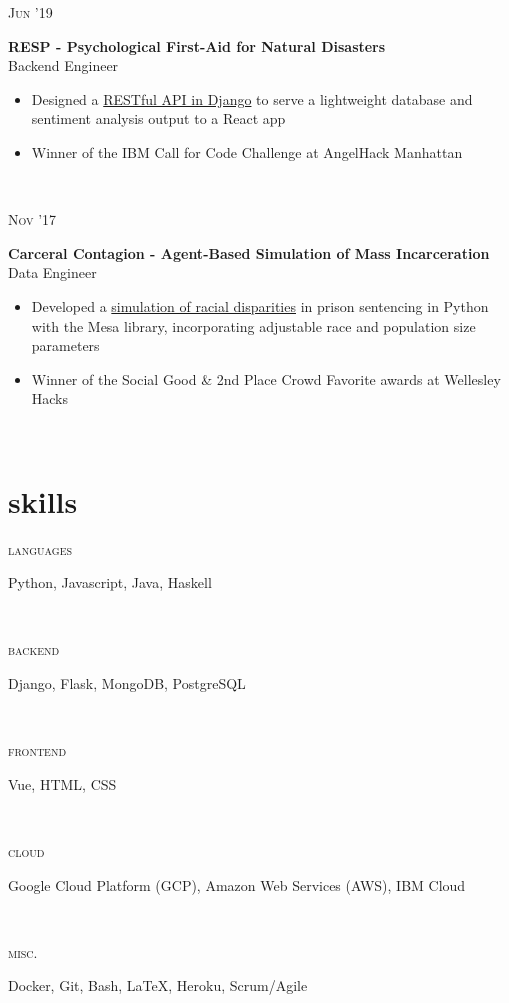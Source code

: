\documentclass[letterpaper, 11pt]{article}
\newcommand{\projectentry}[4]{
    \begin{minipage}[t]{.15\linewidth}
    \hfill \textsc{#1}
    \end{minipage}
    \hfill\vline\hfill
    \begin{minipage}[t]{.80\linewidth}
    {\bf#2}
    \\ #3 
    \vspace{-1.5mm}
    \small{#4}
    \end{minipage}\\
    \vspace{.2cm}
    }
\newcommand{\skillentry}[2]{
    \begin{minipage}[t]{.15\linewidth}
        \hfill \textsc{#1}
        \end{minipage}
        \hfill\vline\hfill
        \begin{minipage}[t]{.80\linewidth}
        #2
        \end{minipage}\\
    }
\begin{document}
        \projectentry{Jun '19}
        {RESP - Psychological First-Aid for Natural Disasters}
        {Backend Engineer}
        {\begin{itemize}
            \setlength\itemsep{0.1mm}
            \item Designed a \href{https://github.com/msradam/resp}{RESTful API in Django} to serve a lightweight database and sentiment analysis output to a React app
            \item Winner of the IBM Call for Code Challenge at AngelHack Manhattan
          \end{itemize}
        }

        \projectentry{Nov '17}
        {Carceral Contagion - Agent-Based Simulation of Mass Incarceration}
        {Data Engineer}
        {\begin{itemize}
            \setlength\itemsep{0.1mm}
            \item Developed a \href{https://github.com/msradam/carceral-contagion}{simulation of racial disparities} in prison sentencing in Python with the Mesa library, incorporating adjustable race and population size parameters
            \item Winner of the Social Good \& 2nd Place Crowd Favorite awards at Wellesley Hacks
          \end{itemize}
        }


    \section{skills}

    \skillentry{languages}{Python, Javascript, Java, Haskell}
    \skillentry{backend}{Django, Flask, MongoDB, PostgreSQL}
    \skillentry{frontend}{Vue, HTML, CSS}
    \skillentry{cloud}{Google Cloud Platform (GCP), Amazon Web Services (AWS), IBM Cloud}
    \skillentry{misc.}{Docker, Git, Bash, LaTeX, Heroku, Scrum/Agile}
    
\end{document}
